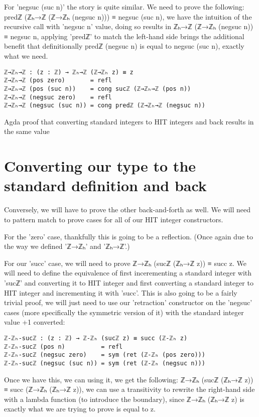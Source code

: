 For 'negsuc (suc n)' the story is quite similar. We need to prove the following: predℤ (ℤₕ→ℤ (ℤ→ℤₕ (negsuc n))) ≡ negsuc (suc n), we have the intuition of the recursive call with 'negsuc n' value, doing so results in ℤₕ→ℤ (ℤ→ℤₕ (negsuc n)) ≡ negsuc n, applying 'predℤ' to match the left-hand side brings the additional benefit that definitionally predℤ (negsuc n) is equal to negsuc (suc n), exactly what we need.

\begin{listing}[H]
\begin{verbatim}
ℤ→ℤₕ→ℤ : (z : ℤ) → ℤₕ→ℤ (ℤ→ℤₕ z) ≡ z
ℤ→ℤₕ→ℤ (pos zero)       = refl
ℤ→ℤₕ→ℤ (pos (suc n))    = cong sucℤ (ℤ→ℤₕ→ℤ (pos n))
ℤ→ℤₕ→ℤ (negsuc zero)    = refl
ℤ→ℤₕ→ℤ (negsuc (suc n)) = cong predℤ (ℤ→ℤₕ→ℤ (negsuc n))
\end{verbatim}
\caption{Agda proof that converting standard integers to HIT integers and back results in the same value}
\end{listing}

\section{Converting our type to the standard definition and back}
Conversely, we will have to prove the other back-and-forth as well. We will need to pattern match to prove cases for all of our HIT integer constructors.

For the 'zero' case, thankfully this is going to be a reflection. (Once again due to the way we defined 'ℤ→ℤₕ' and 'ℤₕ→ℤ'.)

For our 'succ' case, we will need to prove ℤ→ℤₕ (sucℤ (ℤₕ→ℤ z)) ≡ succ z. We will need to define the equivalence of first incerementing a standard integer with 'sucℤ' and converting it to HIT integer and first converting a standard integer to HIT integer and incrementing it with 'succ'. This is also going to be a fairly trivial proof, we will just need to use our 'retraction' constructor on the 'negsuc' cases (more specifically the symmetric version of it) with the standard integer value +1 converted:
\begin{verbatim}
ℤ-ℤₕ-sucℤ : (z : ℤ) → ℤ-ℤₕ (sucℤ z) ≡ succ (ℤ-ℤₕ z)
ℤ-ℤₕ-sucℤ (pos n)          = refl
ℤ-ℤₕ-sucℤ (negsuc zero)    = sym (ret (ℤ-ℤₕ (pos zero)))
ℤ-ℤₕ-sucℤ (negsuc (suc n)) = sym (ret (ℤ-ℤₕ (negsuc n)))
\end{verbatim}
Once we have this, we can using it, we get the following: ℤ→ℤₕ (sucℤ (ℤₕ→ℤ z)) ≡ succ (ℤ→ℤₕ (ℤₕ→ℤ z)), we can use a transitivity to rewrite the right-hand side with a lambda function (to introduce the boundary), since ℤ→ℤₕ (ℤₕ→ℤ z) is exactly what we are trying to prove is equal to z.

